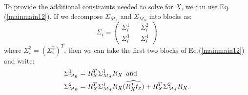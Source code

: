 \documentclass[twocolumn,10pt]{asme2ej}
\begin{document}
To provide the additional constraints needed to solve for $X$, we can use Eq.(\ref{mainmain12}). If we decompose $\Sigma_{M_A}$ and $\Sigma_{M_B}$ into blocks as:
$$ \Sigma_{i}= \left(\begin{array}{ccc}
\Sigma_{i}^1 && \Sigma_{i}^2 \\
\Sigma_{i}^3 && \Sigma_{i}^4  \end{array}\right)
$$
where $\Sigma_{i}^3 = (\Sigma_{i}^2)^T$, then we can take the first two blocks of Eq.(\ref{mainmain12}) and write:
\begin{equation}
\begin{split}
&\Sigma_{M_B}^1 =  R^T_X \Sigma_{M_A}^1 R_X {\rm \,\,\, and \,\,\,} \\
&\Sigma_{M_B}^2 =  R^T_X \Sigma_{M_A}^1 R_X(\widehat{R^T_X t_x}) + R^T_X \Sigma_{M_A}^2 R_X \label{set1}.
\end{split}
\end{equation}

\end{document}
